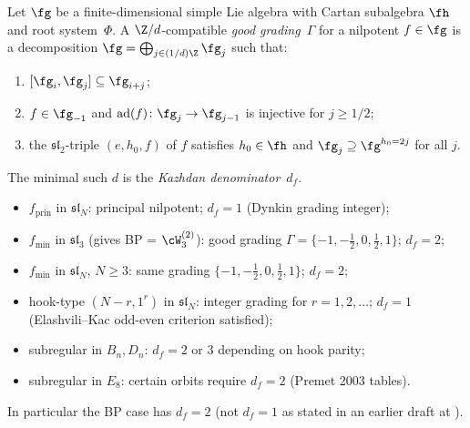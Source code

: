 \begin{definition}
\label{def:good-1-over-d-grading}
Let $\fg$ be a finite-dimensional simple Lie algebra with Cartan
subalgebra $\fh$ and root system~$\Phi$. A $\Z/d$-compatible
\emph{good grading}~$\Gamma$ for a nilpotent $f \in \fg$ is a
decomposition $\fg = \bigoplus_{j \in (1/d)\Z} \fg_{j}$ such that:
\begin{enumerate}[label=\textup{(G\arabic*)},nosep]
\item $[\fg_{i}, \fg_{j}] \subseteq \fg_{i+j}$;
\item $f \in \fg_{-1}$ and $\operatorname{ad}(f)\colon
      \fg_{j} \to \fg_{j-1}$ is injective for $j \ge 1/2$;
\item the $\mathfrak{sl}_{2}$-triple $(e, h_{0}, f)$ of $f$
      satisfies $h_{0} \in \fh$ and
      $\fg_{j} \supseteq \fg^{h_{0} = 2j}$ for all $j$.
\end{enumerate}
The minimal such $d$ is the \emph{Kazhdan denominator}~$d_{f}$.
\end{definition}

\begin{example}
\label{ex:kazhdan-denominator-table}
\mbox{}
\begin{itemize}[nosep]
\item $f_{\mathrm{prin}}$ in $\mathfrak{sl}_{N}$: principal nilpotent;
      $d_{f} = 1$ (Dynkin grading integer);
\item $f_{\min}$ in $\mathfrak{sl}_{3}$ (gives BP = $\cW_{3}^{(2)}$):
      good grading $\Gamma = \{-1, -\tfrac{1}{2}, 0, \tfrac{1}{2}, 1\}$;
      $d_{f} = 2$;
\item $f_{\min}$ in $\mathfrak{sl}_{N}$, $N \ge 3$: same grading
      $\{-1, -\tfrac{1}{2}, 0, \tfrac{1}{2}, 1\}$; $d_{f} = 2$;
\item hook-type $(N-r, 1^{r})$ in $\mathfrak{sl}_{N}$: integer
      grading for $r = 1, 2, \ldots$; $d_{f} = 1$ (Elashvili--Kac
      odd-even criterion satisfied);
\item subregular in $B_{n}, D_{n}$: $d_{f} = 2$ or $3$ depending
      on hook parity;
\item subregular in $E_{8}$: certain orbits require $d_{f} = 2$
      (Premet 2003 tables).
\end{itemize}
In particular the BP case has $d_{f} = 2$ (not $d_{f} = 1$ as
stated in an earlier draft at
\cite[proof-sketch L840]{e-infinity-topologization-draft}).
\end{example}


